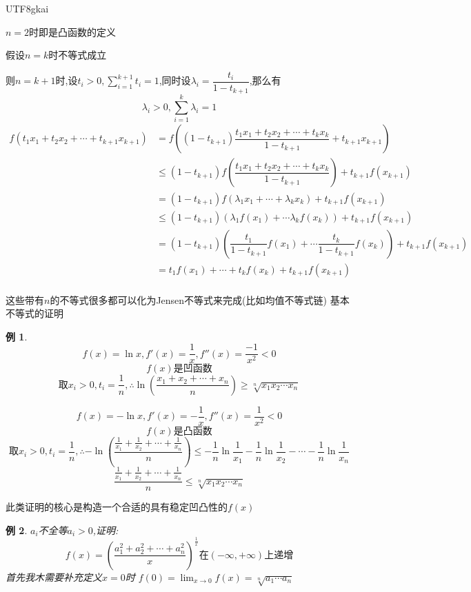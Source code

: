 \documentclass{article}
\newtheorem{example}{例}[subsection]
\newenvironment{cproof}{%
\heiti{证明}\kaishu
}{%
}
\newcommand{\parameter}[1]{\left(#1\right)}
\begin{document}
\begin{CJK}{UTF8}{gkai}
\begin{cproof}
$n = 2$时即是凸函数的定义

假设$n = k$时不等式成立

则$n = k+1$时,设$t_i > 0 ,\sum_{i = 1} ^ {k + 1} t_i= 1$,同时设$\lambda_i = \dfrac{t_i}{1- t_{k+1}}$,那么有
\[\lambda_i > 0, \sum_{i = 1} ^k \lambda_i = 1\]
\[
\begin{aligned}
f(t_1 x_1 + t_2 x_2 + \cdots + t_{k+1} x_{k+1}) &=f\parameter{(1-t_{k+1})\dfrac{t_1 x_1 + t_2 x_2 + \cdots + t_k x_k}{1-t_{k+1}} + t_{k+1} x_{k+1}}\\
&\leq (1-t_{k+1})f\parameter{\dfrac{t_1 x_1 + t_2 x_2 + \cdots + t_k x_k}{1-t_{k+1}}} + t_{k+1}f(x_{k+1})\\
&=(1-t_{k+1})f(\lambda_1 x_1 + \cdots + \lambda_k x_k) + t_{k+1}f(x_{k+1})\\
&\leq(1-t_{k+1})(\lambda_1 f(x_1) +\cdots \lambda_k f(x_k)) + t_{k+1}f(x_{k+1})\\
&=(1-t_{k+1})\parameter{\dfrac{t_1}{1-t_{k+1}}f(x_1) +\cdots \dfrac{t_k}{1-t_{k+1}}f(x_k)}+ t_{k+1}f(x_{k+1})\\
&=t_1 f(x_1) + \cdots + t_k f(x_k) + t_{k+1} f(x_{k+1})\\
\end{aligned}
\]
\end{cproof}

这些带有$n$的不等式很多都可以化为Jensen不等式来完成(比如均值不等式链)
基本不等式的证明
\begin{example}
\[f(x)= \ln x,f'(x) = \frac{1}{x} , f''(x) = \frac{-1}{x^2} < 0\]
\[f(x)\text{是凹函数}\]
\[\text{取}x_i>0, t_i = \frac{1}{n},\therefore \ln(\frac{x_1 + x_2 +\cdots + x_n}{n})  \geq\sqrt[n]{x_1 x_2 \cdots x_n}\]

\[f(x)=-\ln x,f'(x) = -\frac{1}{x} , f''(x) = \frac{1}{x^2} < 0\]
\[f(x)\text{是凸函数}\]
\[\text{取}x_i>0, t_i = \frac{1}{n},\therefore -\ln(\frac{\frac{1}{x_1} + \frac{1}{x_2} +\cdots + \frac{1}{x_n}}{n})  \leq -\frac{1}{n}\ln\frac{1}{x_1}-\frac{1}{n}\ln\frac{1}{x_2} - \cdots -\frac{1}{n}\ln\frac{1}{x_n}  \]
\[\frac{\frac{1}{x_1} + \frac{1}{x_2} +\cdots + \frac{1}{x_n}}{n} \leq \sqrt[n]{x_1 x_2 \cdots x_n}\]

\end{example}
此类证明的核心是构造一个合适的具有稳定凹凸性的$f(x)$\\

\begin{example}
  $a_i$不全等$a_i > 0$,证明:\\
  \[f(x) = (\dfrac{a_1^2 + a_2^2 +\cdots + a_n^2}{x})^{\frac{1}{x}}\text{在}(-\infty,+\infty)\text{上递增}\]
首先我木需要补充定义$x=0$时 $f(0) = \lim_{x\to 0}f(x) = \sqrt[n]{a_1\cdots a_n}$\\


\end{example}
\end{CJK}
\end{document}
